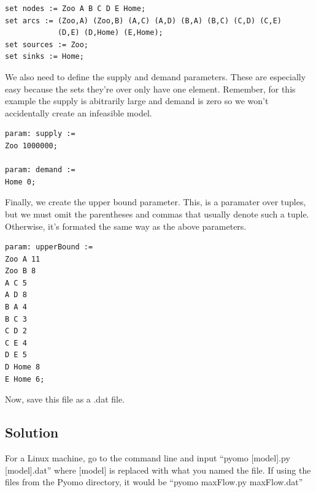 \documentclass{article}
\begin{document}
\begin{verbatim}
set nodes := Zoo A B C D E Home;
set arcs := (Zoo,A) (Zoo,B) (A,C) (A,D) (B,A) (B,C) (C,D) (C,E) 
            (D,E) (D,Home) (E,Home);
set sources := Zoo;
set sinks := Home;
\end{verbatim}

We also need to define the supply and demand parameters.  These are especially easy because the sets they're over only have one element.  Remember, for this example the supply is abitrarily large and demand is zero so we won't accidentally create an infeasible model.

\begin{verbatim}
param: supply :=
Zoo 1000000;

param: demand :=
Home 0;
\end{verbatim}

Finally, we create the upper bound parameter.  This, is a paramater over tuples, but we must omit the parentheses and commas that usually denote such a tuple.  Otherwise, it's formated the same way as the above parameters.

\begin{verbatim}
param: upperBound :=
Zoo A 11
Zoo B 8
A C 5
A D 8
B A 4
B C 3
C D 2
C E 4
D E 5
D Home 8
E Home 6;
\end{verbatim}

Now, save this file as a .dat file.

\subsection*{Solution}

For a Linux machine, go to the command line and input ``pyomo [model].py [model].dat'' where [model] is replaced with what you named the file.  If using the files from the Pyomo directory, it would be ``pyomo maxFlow.py maxFlow.dat''
\end{document}
